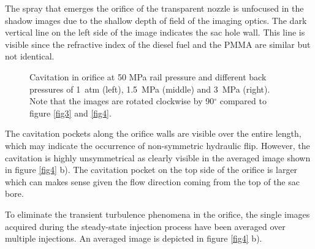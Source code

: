 \documentclass[letterpaper,twocolumn,10pt]{ilass}
\begin{document}
The spray that emerges the orifice of the transparent nozzle is unfocused in the shadow
images due to the shallow depth of field of the imaging optics. The dark vertical line on
the left side of the image indicates the sac hole wall. This line is visible since the
refractive index of the diesel fuel and the PMMA are similar but not identical.


\begin{figure}[h]
\begin{center}
\end{center}
\vspace*{-2mm}
\caption{Cavitation in orifice at 50 MPa rail pressure and different back pressures of
         1~atm (left), 1.5~MPa (middle) and 3~MPa (right). Note that the images are
				 rotated clockwise by 90$^{\circ}$ compared to figure \ref{fig3} and \ref{fig4}.}
\label{fig5} 
\end{figure}


The cavitation pockets along the orifice walls are visible over the entire length,
which may indicate the occurrence of non-symmetric hydraulic flip.
However, the cavitation is highly unsymmetrical as clearly visible in the averaged image shown
in figure \ref{fig4} b). The cavitation pocket on the top side of the orifice is larger which
can makes sense given the flow direction coming from the top of the sac bore.
%

To eliminate the transient turbulence phenomena in the orifice, the single images
acquired during the steady-state injection process have been averaged over multiple injections. An averaged image is depicted in figure \ref{fig4} b).
%
\end{document}

